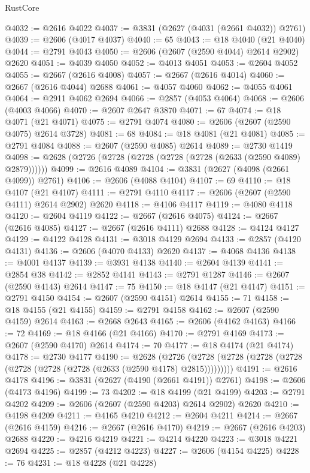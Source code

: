 \begin{lexlean}{RustCore}
\begin{coremodule}
@4032 := @2616 @4022
@4037 := @3831 (@2627 (@4031 (@2661 @4032)) @2761)
@4039 := @2606 (@4017 @4037)
@4040 := 65
@4043 := @18 @4040 (@21 @4040)
@4044 := @2791 @4043
@4050 := @2606 (@2607 (@2590 @4044) @2614 @2902) @2620
@4051 := @4039 @4050
@4052 := @4013 @4051
@4053 := @2604 @4052
@4055 := @2667 (@2616 @4008)
@4057 := @2667 (@2616 @4014)
@4060 := @2667 (@2616 @4044) @2688
@4061 := @4057 @4060
@4062 := @4055 @4061
@4064 := @2911 @4062 @2694
@4066 := @2857 (@4053 @4064)
@4068 := @2606 (@4003 @4066)
@4070 := @2607 @2647 @3870
@4071 := 67
@4074 := @18 @4071 (@21 @4071)
@4075 := @2791 @4074
@4080 := @2606 (@2607 (@2590 @4075) @2614 @3728)
@4081 := 68
@4084 := @18 @4081 (@21 @4081)
@4085 := @2791 @4084
@4088 := @2607 (@2590 @4085) @2614
@4089 := @2730 @1419
@4098 := @2628 (@2726 (@2728 (@2728 (@2728 (@2728 (@2633 (@2590 @4089) @2879))))))
@4099 := @2616 @4089
@4104 := @3831 (@2627 (@4098 (@2661 @4099)) @2761)
@4106 := @2606 (@4088 @4104)
@4107 := 69
@4110 := @18 @4107 (@21 @4107)
@4111 := @2791 @4110
@4117 := @2606 (@2607 (@2590 @4111) @2614 @2902) @2620
@4118 := @4106 @4117
@4119 := @4080 @4118
@4120 := @2604 @4119
@4122 := @2667 (@2616 @4075)
@4124 := @2667 (@2616 @4085)
@4127 := @2667 (@2616 @4111) @2688
@4128 := @4124 @4127
@4129 := @4122 @4128
@4131 := @3018 @4129 @2694
@4133 := @2857 (@4120 @4131)
@4136 := @2606 (@4070 @4133) @2620
@4137 := @4068 @4136
@4138 := @4001 @4137
@4139 := @3931 @4138
@4140 := @2604 @4139
@4141 := @2854 @38
@4142 := @2852 @4141
@4143 := @2791 @1287
@4146 := @2607 (@2590 @4143) @2614
@4147 := 75
@4150 := @18 @4147 (@21 @4147)
@4151 := @2791 @4150
@4154 := @2607 (@2590 @4151) @2614
@4155 := 71
@4158 := @18 @4155 (@21 @4155)
@4159 := @2791 @4158
@4162 := @2607 (@2590 @4159) @2614
@4163 := @2668 @2643
@4165 := @2606 (@4162 @4163)
@4166 := 72
@4169 := @18 @4166 (@21 @4166)
@4170 := @2791 @4169
@4173 := @2607 (@2590 @4170) @2614
@4174 := 70
@4177 := @18 @4174 (@21 @4174)
@4178 := @2730 @4177
@4190 := @2628
    (@2726 (@2728 (@2728 (@2728 (@2728 (@2728 (@2728 (@2728 (@2633 (@2590 @4178) @2815)))))))))
@4191 := @2616 @4178
@4196 := @3831 (@2627 (@4190 (@2661 @4191)) @2761)
@4198 := @2606 (@4173 @4196)
@4199 := 73
@4202 := @18 @4199 (@21 @4199)
@4203 := @2791 @4202
@4209 := @2606 (@2607 (@2590 @4203) @2614 @2902) @2620
@4210 := @4198 @4209
@4211 := @4165 @4210
@4212 := @2604 @4211
@4214 := @2667 (@2616 @4159)
@4216 := @2667 (@2616 @4170)
@4219 := @2667 (@2616 @4203) @2688
@4220 := @4216 @4219
@4221 := @4214 @4220
@4223 := @3018 @4221 @2694
@4225 := @2857 (@4212 @4223)
@4227 := @2606 (@4154 @4225)
@4228 := 76
@4231 := @18 @4228 (@21 @4228)

\end{coremodule}
\end{lexlean}
